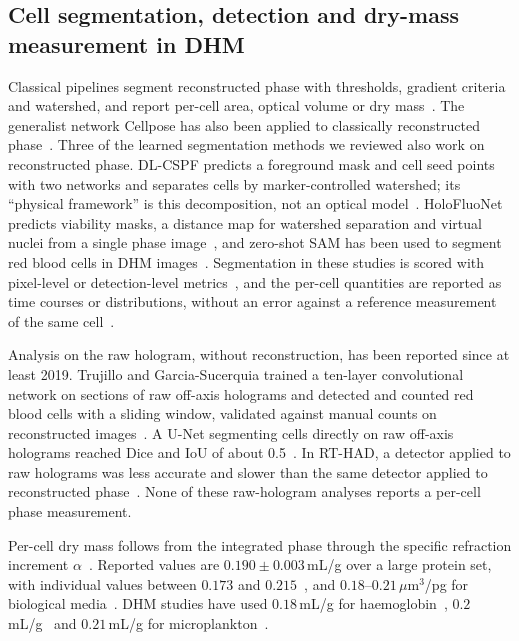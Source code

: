 \documentclass[11pt]{article}
\begin{document}
\subsection{Cell segmentation, detection and dry-mass measurement in DHM}
\label{sec:rw-seg}

Classical pipelines segment reconstructed phase with thresholds, gradient
criteria and watershed, and report per-cell area, optical volume or dry
mass~\cite{shen2022laf,bai2026macrophage,kyeremah2025malaria}. The generalist
network Cellpose has also been applied to classically reconstructed
phase~\cite{llaguno2025dhm}. Three of the learned segmentation methods we
reviewed also work on reconstructed phase. DL-CSPF predicts a foreground mask
and cell seed points with two networks and separates cells by marker-controlled
watershed; its ``physical framework'' is this decomposition, not an optical
model~\cite{li2025dlcspf}. HoloFluoNet predicts viability masks, a distance map
for watershed separation and virtual nuclei from a single phase
image~\cite{park2025holofluonet}, and zero-shot SAM has been used to segment red
blood cells in DHM images~\cite{numata2024rbcsam}. Segmentation in these studies
is scored with pixel-level or detection-level
metrics~\cite{li2025dlcspf,park2025holofluonet,numata2024rbcsam}, and the
per-cell quantities are reported as time courses or distributions, without an
error against a reference measurement of the same
cell~\cite{shen2022laf,li2025dlcspf,park2025holofluonet}.

Analysis on the raw hologram, without reconstruction, has been reported since
at least 2019. Trujillo and Garcia-Sucerquia trained a ten-layer convolutional
network on sections of raw off-axis holograms and detected and counted red
blood cells with a sliding window, validated against manual counts on
reconstructed images~\cite{trujillo2019automatic}. A U-Net segmenting cells
directly on raw off-axis holograms reached Dice and IoU of about
0.5~\cite{wen2026direct}. In RT-HAD, a detector applied to raw holograms was
less accurate and slower than the same detector applied to reconstructed
phase~\cite{delikoyun2025rthad}. None of these raw-hologram analyses reports a
per-cell phase measurement.

Per-cell dry mass follows from the integrated phase through the specific
refraction increment $\alpha$~\cite{barer1952,zangle2014}. Reported values are
$0.190\pm0.003$\,mL/g over a large protein set, with individual values between
$0.173$ and $0.215$~\cite{zhao2011}, and $0.18$--$0.21\,\mu$m$^3$/pg for
biological media~\cite{chaumet2024}. DHM studies have used $0.18$\,mL/g for
haemoglobin~\cite{moon2026aidhm},
$0.2$\,mL/g~\cite{shen2022laf,li2025dlcspf,jaferzadeh2022holophasenet} and
$0.21$\,mL/g for microplankton~\cite{bachimanchi2022microplankton}.
\end{document}
